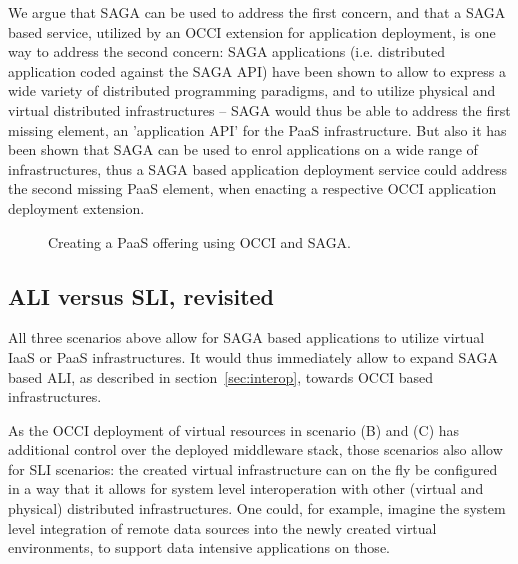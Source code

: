 \documentclass[10pt,conference,final,letterpaper,twoside,twocolumn,]{IEEEtran}
\begin{document}
We argue that SAGA can be used to address the first concern, and that
a SAGA based service, utilized by an OCCI extension for application
deployment, is one way to address the second concern: SAGA
applications (i.e. distributed application coded against the SAGA API)
have been shown to allow to express a wide variety of distributed
programming paradigms, and to utilize physical and virtual distributed
infrastructures -- SAGA would thus be able to address the first
missing element, an 'application API' for the PaaS infrastructure.
But also it has been shown that SAGA can be used to enrol applications
on a wide range of infrastructures, thus a SAGA based application
deployment service could address the second missing PaaS element, when
enacting a respective OCCI application deployment extension.

 \begin{figure}[htb]
  \caption{\label{fig:arch3} Creating a PaaS offering using OCCI and SAGA.}
 \end{figure}



 \subsection{ALI versus SLI, revisited}

 All three scenarios above allow for SAGA based applications to
 utilize virtual IaaS or PaaS infrastructures.  It would thus
 immediately allow to expand SAGA based ALI, as described in
 section~\ref{sec:interop}, towards OCCI based infrastructures.

 As the OCCI deployment of virtual resources in scenario (B) and (C)
 has additional control over the deployed middleware stack, those
 scenarios also allow for SLI scenarios: the created virtual
 infrastructure can on the fly be configured in a way that it allows
 for system level interoperation with other (virtual and physical)
 distributed infrastructures.  One could, for example, imagine the
 system level integration of remote data sources into the newly
 created virtual environments, to support data intensive applications
 on those.
\end{document}
